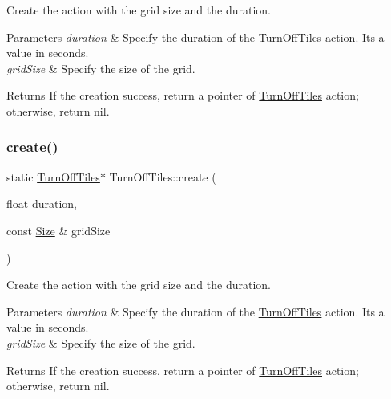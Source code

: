 Create the action with the grid size and the duration. 


\begin{DoxyParams}{Parameters}
{\em duration} & Specify the duration of the \hyperlink{classTurnOffTiles}{Turn\+Off\+Tiles} action. It\textquotesingle{}s a value in seconds. \\
\hline
{\em grid\+Size} & Specify the size of the grid. \\
\hline
\end{DoxyParams}
\begin{DoxyReturn}{Returns}
If the creation success, return a pointer of \hyperlink{classTurnOffTiles}{Turn\+Off\+Tiles} action; otherwise, return nil. 
\end{DoxyReturn}
\mbox{\label{classTurnOffTiles_a401085568f4dc0441f5314442b2d19ec}} 
\subsubsection{\texorpdfstring{create()}{create()}\hspace{0.1cm}{\footnotesize\ttfamily [2/4]}}
{\footnotesize\ttfamily static \hyperlink{classTurnOffTiles}{Turn\+Off\+Tiles}$\ast$ Turn\+Off\+Tiles\+::create (\begin{DoxyParamCaption}\item[{float}]{duration,  }\item[{const \hyperlink{classSize}{Size} \&}]{grid\+Size }\end{DoxyParamCaption})\hspace{0.3cm}{\ttfamily [static]}}



Create the action with the grid size and the duration. 


\begin{DoxyParams}{Parameters}
{\em duration} & Specify the duration of the \hyperlink{classTurnOffTiles}{Turn\+Off\+Tiles} action. It\textquotesingle{}s a value in seconds. \\
\hline
{\em grid\+Size} & Specify the size of the grid. \\
\hline
\end{DoxyParams}
\begin{DoxyReturn}{Returns}
If the creation success, return a pointer of \hyperlink{classTurnOffTiles}{Turn\+Off\+Tiles} action; otherwise, return nil. 
\end{DoxyReturn}
\mbox{\label{classTurnOffTiles_a7db2be7fd181ac9cac678fa2f3801471}} 
